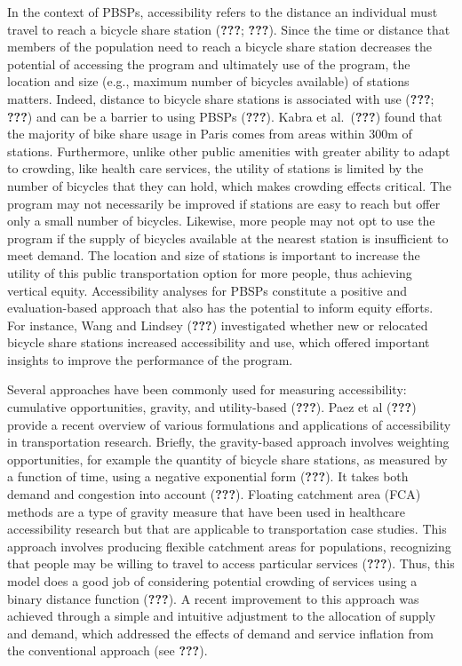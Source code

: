 \documentclass[]{elsarticle} %
\begin{document}
In the context of PBSPs, accessibility refers to the distance an
individual must travel to reach a bicycle share station ({\textbf{???}};
{\textbf{???}}). Since the time or distance that members of the
population need to reach a bicycle share station decreases the potential
of accessing the program and ultimately use of the program, the location
and size (e.g., maximum number of bicycles available) of stations
matters. Indeed, distance to bicycle share stations is associated with
use ({\textbf{???}}; {\textbf{???}}) and can be a barrier to using PBSPs
({\textbf{???}}). Kabra et al.~({\textbf{???}}) found that the majority
of bike share usage in Paris comes from areas within 300m of stations.
Furthermore, unlike other public amenities with greater ability to adapt
to crowding, like health care services, the utility of stations is
limited by the number of bicycles that they can hold, which makes
crowding effects critical. The program may not necessarily be improved
if stations are easy to reach but offer only a small number of bicycles.
Likewise, more people may not opt to use the program if the supply of
bicycles available at the nearest station is insufficient to meet
demand. The location and size of stations is important to increase the
utility of this public transportation option for more people, thus
achieving vertical equity. Accessibility analyses for PBSPs constitute a
positive and evaluation-based approach that also has the potential to
inform equity efforts. For instance, Wang and Lindsey ({\textbf{???}})
investigated whether new or relocated bicycle share stations increased
accessibility and use, which offered important insights to improve the
performance of the program.

Several approaches have been commonly used for measuring accessibility:
cumulative opportunities, gravity, and utility-based ({\textbf{???}}).
Paez et al ({\textbf{???}}) provide a recent overview of various
formulations and applications of accessibility in transportation
research. Briefly, the gravity-based approach involves weighting
opportunities, for example the quantity of bicycle share stations, as
measured by a function of time, using a negative exponential form
({\textbf{???}}). It takes both demand and congestion into account
({\textbf{???}}). Floating catchment area (FCA) methods are a type of
gravity measure that have been used in healthcare accessibility research
but that are applicable to transportation case studies. This approach
involves producing flexible catchment areas for populations, recognizing
that people may be willing to travel to access particular services
({\textbf{???}}). Thus, this model does a good job of considering
potential crowding of services using a binary distance function
({\textbf{???}}). A recent improvement to this approach was achieved
through a simple and intuitive adjustment to the allocation of supply
and demand, which addressed the effects of demand and service inflation
from the conventional approach (see {\textbf{???}}).
\end{document}
